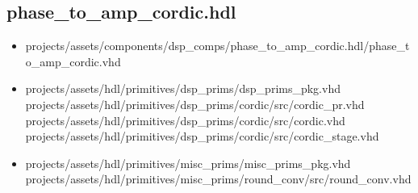 \documentclass{article}
\def\comp{phase\_to\_amp\_cordic}
\begin{document}
\subsection*{\comp.hdl}
\begin{itemize}
	\item projects/assets/components/dsp\_comps/phase\_to\_amp\_cordic.hdl/phase\_to\_amp\_cordic.vhd
	\item projects/assets/hdl/primitives/dsp\_prims/dsp\_prims\_pkg.vhd
	      \subitem projects/assets/hdl/primitives/dsp\_prims/cordic/src/cordic\_pr.vhd
	      \subitem projects/assets/hdl/primitives/dsp\_prims/cordic/src/cordic.vhd
	      \subitem projects/assets/hdl/primitives/dsp\_prims/cordic/src/cordic\_stage.vhd
	\item projects/assets/hdl/primitives/misc\_prims/misc\_prims\_pkg.vhd
	      \subitem projects/assets/hdl/primitives/misc\_prims/round\_conv/src/round\_conv.vhd
\end{itemize}
\end{document}

